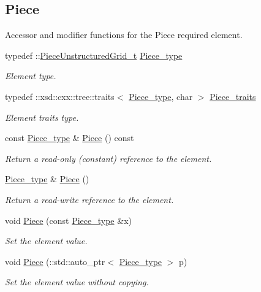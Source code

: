 \subsection*{Piece}
\label{_amgrpa5d512bf83495b68d0ffa20f79804dfc}%
Accessor and modifier functions for the Piece required element. \begin{DoxyCompactItemize}
\item 
typedef \+::\hyperlink{classPieceUnstructuredGrid__t}{Piece\+Unstructured\+Grid\+\_\+t} \hyperlink{classUnstructuredGrid__t_a559913611314b34f4868027fc91e35bc}{Piece\+\_\+type}
\begin{DoxyCompactList}\small\item\em Element type. \end{DoxyCompactList}\item 
typedef \+::xsd\+::cxx\+::tree\+::traits$<$ \hyperlink{classUnstructuredGrid__t_a559913611314b34f4868027fc91e35bc}{Piece\+\_\+type}, char $>$ \hyperlink{classUnstructuredGrid__t_a8a9bf012c364a5fbb78aac9a319a4dad}{Piece\+\_\+traits}
\begin{DoxyCompactList}\small\item\em Element traits type. \end{DoxyCompactList}\item 
const \hyperlink{classUnstructuredGrid__t_a559913611314b34f4868027fc91e35bc}{Piece\+\_\+type} \& \hyperlink{classUnstructuredGrid__t_a32fdd47d79cfdd2eb071cf674b7cc9ee}{Piece} () const 
\begin{DoxyCompactList}\small\item\em Return a read-\/only (constant) reference to the element. \end{DoxyCompactList}\item 
\hyperlink{classUnstructuredGrid__t_a559913611314b34f4868027fc91e35bc}{Piece\+\_\+type} \& \hyperlink{classUnstructuredGrid__t_a66b7c6fc204fdc78b4611fd132771573}{Piece} ()
\begin{DoxyCompactList}\small\item\em Return a read-\/write reference to the element. \end{DoxyCompactList}\item 
void \hyperlink{classUnstructuredGrid__t_a97ef3f79738631a4265c4fbeb170f04d}{Piece} (const \hyperlink{classUnstructuredGrid__t_a559913611314b34f4868027fc91e35bc}{Piece\+\_\+type} \&x)
\begin{DoxyCompactList}\small\item\em Set the element value. \end{DoxyCompactList}\item 
void \hyperlink{classUnstructuredGrid__t_aadd93b1b259778a8ef49c3d6e5b0be5d}{Piece} (\+::std\+::auto\+\_\+ptr$<$ \hyperlink{classUnstructuredGrid__t_a559913611314b34f4868027fc91e35bc}{Piece\+\_\+type} $>$ p)
\begin{DoxyCompactList}\small\item\em Set the element value without copying. \end{DoxyCompactList}\end{DoxyCompactItemize}
